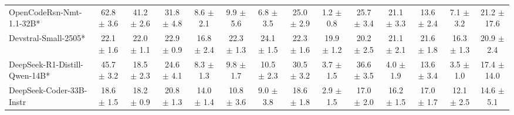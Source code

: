 \begin{table}[hbt]
{\begin{tabular}{l *{13}{c}}
\rowcolor{gray!10}
OpenCodeRsn-Nmt-1.1-32B* &
62.8 {\tiny$\pm$ 3.6} &
41.2 {\tiny$\pm$ 2.6} &
31.8 {\tiny$\pm$ 4.8} &
8.6 {\tiny$\pm$ 2.1} &
9.9 {\tiny$\pm$ 5.6} &
6.8 {\tiny$\pm$ 3.5} &
25.0 {\tiny$\pm$ 2.9} &
1.2 {\tiny$\pm$ 0.8} &
25.7 {\tiny$\pm$ 3.4} &
21.1 {\tiny$\pm$ 3.3} &
13.6 {\tiny$\pm$ 2.4} &
7.1 {\tiny$\pm$ 3.2} &
21.2 {\tiny$\pm$ 17.6} \\

Devstral-Small-2505* &
22.1 {\tiny$\pm$ 1.6} &
22.0 {\tiny$\pm$ 1.1} &
22.9 {\tiny$\pm$ 0.9} &
16.8 {\tiny$\pm$ 2.4} &
22.3 {\tiny$\pm$ 1.3} &
24.1 {\tiny$\pm$ 1.5} &
22.3 {\tiny$\pm$ 1.6} &
19.9 {\tiny$\pm$ 1.2} &
20.2 {\tiny$\pm$ 2.5} &
21.1 {\tiny$\pm$ 2.1} &
21.6 {\tiny$\pm$ 1.8} &
16.3 {\tiny$\pm$ 1.3} &
20.9 {\tiny$\pm$ 2.4} \\


\rowcolor{gray!10}
DeepSeek-R1-Distill-Qwen-14B* &
45.7 {\tiny$\pm$ 3.2} & 
18.5 {\tiny$\pm$ 2.3} & 
24.6 {\tiny$\pm$ 4.1} & 
8.3 {\tiny$\pm$ 1.3} &
9.8 {\tiny$\pm$ 1.7} & 
10.5 {\tiny$\pm$ 2.3} & 
30.5 {\tiny$\pm$ 3.2} & 
3.7 {\tiny$\pm$ 1.5} &
36.6 {\tiny$\pm$ 3.5} & 
4.0 {\tiny$\pm$ 1.9} & 
13.6 {\tiny$\pm$ 3.4} & 
3.5 {\tiny$\pm$ 1.0} &
17.4 {\tiny$\pm$ 14.0} \\


DeepSeek-Coder-33B-Instr &
18.6 {\tiny$\pm$ 1.5} &
18.2 {\tiny$\pm$ 0.9} &
20.8 {\tiny$\pm$ 1.3} &
14.0 {\tiny$\pm$ 1.4} &
10.8 {\tiny$\pm$ 3.6} &
9.0 {\tiny$\pm$ 3.8} &
18.6 {\tiny$\pm$ 1.8} &
2.9 {\tiny$\pm$ 1.5} &
17.0 {\tiny$\pm$ 2.0} &
16.2 {\tiny$\pm$ 1.5} &
17.0 {\tiny$\pm$ 1.7} &
12.1 {\tiny$\pm$ 2.5} &
14.6 {\tiny$\pm$ 5.1} \\


\bottomrule
\end{tabular}%
}
\end{table}
